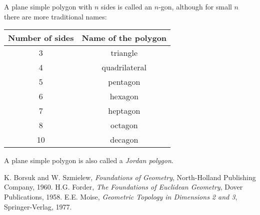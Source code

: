 \documentclass[12pt]{article}
\begin{document}
A plane simple polygon with $n$ sides is called an $n$-gon, although for small $n$
there are more traditional names:

\begin{center}
\begin{tabular}{||c|c||} \hline
Number of sides& Name of the polygon \\ \hline
3 & triangle \\
4 & quadrilateral \\
5 & pentagon\\
6 & hexagon \\
7 & heptagon\\
8 & octagon\\
10 & decagon\\
\hline 
\end{tabular}
\end{center}

A plane simple polygon is also called a \emph{Jordan polygon}. 















\begin{thebibliography}{9}
K. Borsuk and W. Szmielew, \emph{Foundations of Geometry},
North-Holland Publishing Company, 1960.
H.G. Forder, \emph{The Foundations of Euclidean Geometry},
Dover Publications, 1958.
E.E. Moise, \emph{Geometric Topology in Dimensions 2 and 3}, 
Springer-Verlag, 1977.
 
\end{thebibliography}


\end{document}
